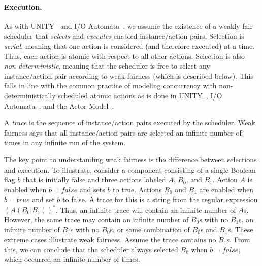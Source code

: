 \paragraph{Execution.}
As with UNITY~\cite{chandy1989parallel} and I/O Automata~\cite{nancy1996distributed}, we assume the existence of a weakly fair scheduler that \emph{selects} and \emph{executes} enabled instance/action pairs.
Selection is \emph{serial}, meaning that one action is considered (and therefore executed) at a time.
Thus, each action is atomic with respect to all other actions.
Selection is also \emph{non-deterministic}, meaning that the scheduler is free to select any instance/action pair according to weak fairness (which is described below).
This falls in line with the common practice of modeling concurrency with non-deterministically scheduled atomic actions as is done in UNITY~\cite{chandy1989parallel}, I/O Automata~\cite{nancy1996distributed}, and the Actor Model~\cite{agha1985actors}.

A \emph{trace} is the sequence of instance/action pairs executed by the scheduler.
Weak fairness says that all instance/action pairs are selected an infinite number of times in any infinite run of the system.

The key point to understanding weak fairness is the difference between selections and execution.
To illustrate, consider a component consisting of a single Boolean flag $b$ that is initially false and three actions labeled $A$, $B_0$, and $B_1$.
Action $A$ is enabled when $b = false$ and sets $b$ to true.
Actions $B_0$ and $B_1$ are enabled when $b = true$ and set $b$ to false.
A trace for this is a string from the regular expression $(A(B_0|B_1))^*$.
Thus, an infinite trace will contain an infinite number of $A$s.
However, the same trace may contain an infinite number of $B_0$s with no $B_1$s, an infinite number of $B_1$s with no $B_0$s, or some combination of $B_0$s and $B_1$s.
These extreme cases illustrate weak fairness.
Assume the trace contains no $B_1$s.
From this, we can conclude that the scheduler always selected $B_0$ when $b = false$, which occurred an infinite number of times.

